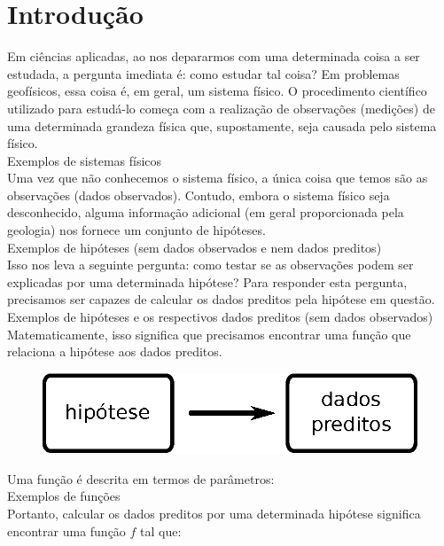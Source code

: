\chapter{Introdução}

\indent Em ciências aplicadas, ao nos depararmos com uma determinada coisa a ser
estudada, a pergunta imediata é: como estudar tal coisa? Em problemas geofísicos,
essa coisa é, em geral, um sistema físico. O procedimento científico utilizado
para estudá-lo começa com a realização de observações (medições) de uma
determinada grandeza física que, supostamente, seja causada pelo sistema físico.
\\
Exemplos de sistemas físicos
\\
\indent Uma vez que não conhecemos o sistema físico, a única coisa que temos são as
observações (dados observados). Contudo, embora o sistema físico seja
desconhecido, alguma informação adicional (em geral proporcionada pela geologia)
nos fornece um conjunto de hipóteses.
\\
Exemplos de hipóteses (sem dados observados e nem dados preditos)
\\
\indent Isso nos leva a seguinte pergunta: como testar se as observações podem ser
explicadas por uma determinada hipótese? Para responder esta pergunta,
precisamos ser capazes de calcular os dados preditos pela hipótese em questão.
\\
Exemplos de hipóteses e os respectivos dados preditos (sem dados observados)
\\
\indent Matematicamente, isso significa que precisamos encontrar uma função que
relaciona a hipótese aos dados preditos.

\begin{figure}
  \centering
    \includegraphics[scale=1]{../figs/hipotese-preditos.eps}
  \label{hipotese-preditos}
\end{figure}

Uma função é descrita em termos de parâmetros:
\\
Exemplos de funções
\\
\indent Portanto, calcular os dados preditos por uma determinada hipótese significa
encontrar uma função $f$ tal que:

